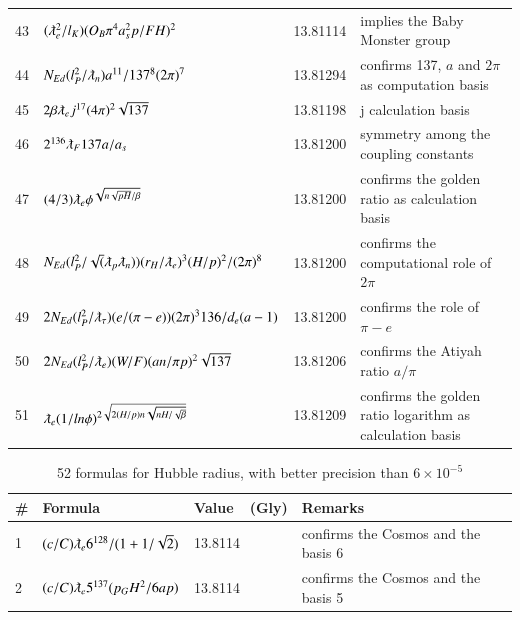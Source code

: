 \documentclass[a4paper,9pt]{article}
\begin{document}
\begin{appendix}
\begin{table}
\begin{tabular}{llll}
   43 & $(\lambdabar_{e} ^2/l_K)(O_B \pi^4 a_s^2 p/FH)^2$ & 13.81114 & implies the Baby Monster group\\
   44 & $N_{Ed}(l_P^2/ \lambdabar_n) a^{11}/137^8 (2\pi)^7   $ & 13.81294 & confirms 137, $a$ and $2\pi$ as computation basis\\
   45 & $2\beta \lambdabar_{e} j^{17} (4\pi)^2 \sqrt{137}$ & 13.81198 & j calculation basis \\
   46 & $ 2^{136}\lambdabar_{F}137 a/a_s $ & 13.81200 & symmetry among the coupling constants \\
   47 & $ (4/3)\lambdabar_e \phi^{\sqrt {n\sqrt{pH}/\beta}} $ & 13.81200 & confirms the golden ratio as calculation basis \\ 
   48 & $N_{Ed}(l_P^2/\sqrt(\lambdabar_p \lambdabar_n)) (r_H/\lambdabar_e)^3 (H/p)^2 / (2\pi)^8  $ & 13.81200 & confirms the computational role of $2\pi$\\ 
   49 & $2N_{Ed}(l_P^2/\lambdabar_{\tau}) (e/(\pi-e)) (2\pi)^3 136/d_e(a-1) $ & 13.81200 & confirms the role of $\pi - e$\\
   50 & $2N_{Ed}(l_P^2/\lambdabar_e) (W/F) (an/\pi p)^2 \sqrt{137} $ & 13.81206 & confirms the Atiyah ratio $a/\pi$\\
   51 & $ \lambdabar_e (1/ln\phi)^{2\sqrt {2(H/p)n\sqrt{nH/\sqrt\beta}}} $ & 13.81209 & confirms the golden ratio logarithm as calculation basis \\ 
   
    \bottomrule
  \end{tabular}
\end{table}




\begin{table}
\caption{52 formulas for Hubble radius, with better precision than $6 \times 10^{-5}$}
\label{tab:7:table7}
  \hskip-2.0cm\begin{tabular}{llll}
    \toprule
    \cmidrule(r){1-4}
   \#     & Formula     & Value~~(Gly) & Remarks \\
    \midrule    
    
  1 & $ (c/C) \lambdabar_{e}  6^{128}/(1+1/\sqrt2)  $ & 13.8114 & confirms the Cosmos and the basis 6 \\
  
    2 & $(c/C) \lambdabar_{e}  5^{137} (p_G H^2/6ap)  $ & 13.8114 & confirms the Cosmos and the basis 5 \\
    

\end{tabular}
\end{table}
\end{appendix}
\end{document}
